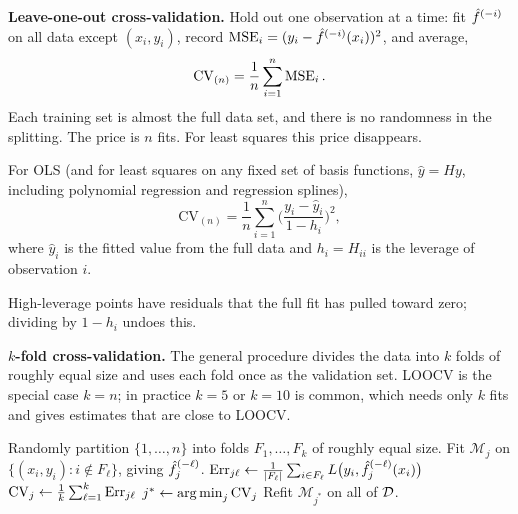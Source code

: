 \smallskip\noindent\textbf{Leave-one-out cross-validation.} Hold out one observation at a time: fit $\hat f^{(-i)}$ on all data except $(x_i,y_i)$, record $\operatorname{MSE}_i=(y_i-\hat f^{(-i)}(x_i))^2$, and average,
\[
\mathrm{CV}_{(n)}=\frac1n\sum_{i=1}^n\operatorname{MSE}_i .
\]
Each training set is almost the full data set, and there is no randomness in the splitting. The price is $n$ fits. For least squares this price disappears.

\begin{proposition}\label{prop:loocv-shortcut}
For OLS (and for least squares on any fixed set of basis functions, $\hat y=Hy$, including polynomial regression and regression splines),
\[
\mathrm{CV}_{(n)}=\frac1n\sum_{i=1}^n\Big(\frac{y_i-\hat y_i}{1-h_i}\Big)^2,
\]
where $\hat y_i$ is the fitted value from the full data and $h_i=H_{ii}$ is the leverage of observation $i$.
\end{proposition}

High-leverage points have residuals that the full fit has pulled toward zero; dividing by $1-h_i$ undoes this.

\smallskip\noindent\textbf{$k$-fold cross-validation.} The general procedure divides the data into $k$ folds of roughly equal size and uses each fold once as the validation set. LOOCV is the special case $k=n$; in practice $k=5$ or $k=10$ is common, which needs only $k$ fits and gives estimates that are close to LOOCV.

\begin{algorithm}[H]
\caption{$k$-Fold Cross-Validation for Model Selection}\label{alg:kfold-cv}
\begin{algorithmic}[1]
\State Randomly partition $\{1,\dots,n\}$ into folds $F_1,\dots,F_k$ of roughly equal size.
    \State Fit $\mathcal{M}_j$ on $\{(x_i,y_i):i\notin F_\ell\}$, giving $\hat f_j^{(-\ell)}$.
    \State $\operatorname{Err}_{j\ell}\gets\frac1{|F_\ell|}\sum_{i\in F_\ell}L\big(y_i,\hat f_j^{(-\ell)}(x_i)\big)$ 
  \EndFor
  \State $\mathrm{CV}_j\gets\frac1k\sum_{\ell=1}^k\operatorname{Err}_{j\ell}$
\EndFor
\State $j^*\gets\operatorname*{arg\,min}_j\mathrm{CV}_j$
\State Refit $\mathcal{M}_{j^*}$ on all of $\mathcal{D}$.
\end{algorithmic}
\end{algorithm}

